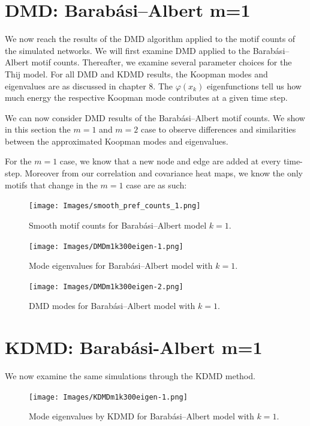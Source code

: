 \section{DMD: Barabási–Albert m=1}
We now reach the results of the DMD algorithm applied to the
motif counts of the simulated networks. We will first examine DMD applied to the 
Barabási–Albert motif counts. Thereafter, we examine several parameter choices for the Thij model.
For all DMD and KDMD results, the Koopman modes
 and eigenvalues are as discussed in chapter 8. The $\varphi(x_k)$ eigenfunctions tell us how much energy the respective Koopman mode contributes at a given time
step.

We can now consider DMD results of the Barabási–Albert motif counts. We show in this section
the $m=1$ and $m=2$ case to observe differences and similarities between the approximated 
Koopman modes and eigenvalues. 

For the $m=1$ case, we know that a new node and edge are added at every time-step. Moreover from our
correlation and covariance heat maps, we know the only motifs that change in the $m=1$ case 
are as such: 

\newpage

\begin{figure}
    \texttt{[image: Images/smooth\_pref\_counts\_1.png]}
    \centering
    \caption{Smooth motif counts for Barabási–Albert model $k=1$.}
\end{figure}
\clearpage

\begin{figure}
    \texttt{[image: Images/DMDm1k300eigen-1.png]}
    \centering
    \caption{Mode eigenvalues for Barabási–Albert model
    with $k=1$.}
\end{figure}

\begin{figure}
    \texttt{[image: Images/DMDm1k300eigen-2.png]}
    \centering
    \caption{DMD modes for Barabási–Albert model
    with $k=1$.}
\end{figure}

\clearpage

\section{KDMD: Barabási-Albert m=1}

We now examine the same simulations through the KDMD method.

\FloatBarrier

\begin{figure}
    \texttt{[image: Images/KDMDm1k300eigen-1.png]}
    \centering
    \caption{Mode eigenvalues by KDMD for Barabási–Albert model
    with $k=1$.}
\end{figure}

